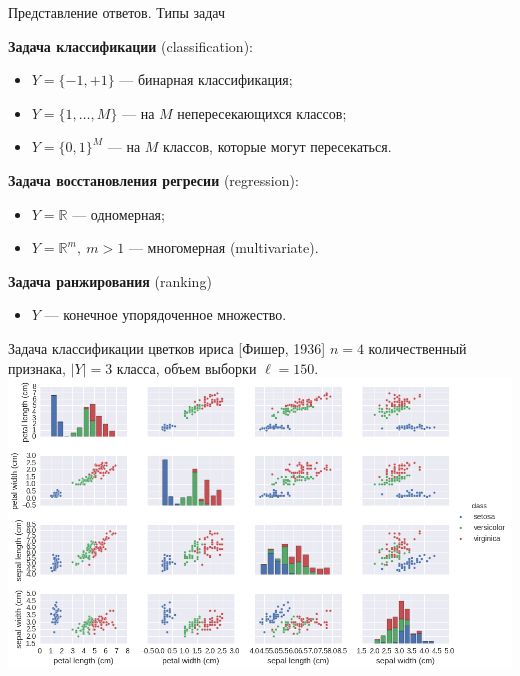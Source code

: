 \documentclass{beamer}
\begin{document}
\begin{frame}{Представление ответов. Типы задач}
    
    {\bf Задача классификации} (classification):
    \begin{itemize}
        \item $Y = \{-1, +1\}$ --- бинарная классификация;
        \item $Y = \{1, \dots, M\}$ --- на $M$ непересекающихся классов;
        \item $Y = \{0, 1\}^M$ --- на $M$ классов, которые могут пересекаться.
    \end{itemize}
    \vfill

    {\bf Задача восстановления регресии} (regression):
    \begin{itemize}
        \item $Y = \mathbb{R}$ --- одномерная;
        \item $Y = \mathbb{R}^m, ~ m > 1$ --- многомерная (multivariate).
    \end{itemize}
    \vfill

    {\bf Задача ранжирования} (ranking)
    \begin{itemize}
        \item $Y$ --- конечное упорядоченное множество.
    \end{itemize}
\end{frame}
\begin{frame}{Задача классификации цветков ириса [Фишер, 1936]}
    \footnotesize $n = 4$ количественный признака, $|Y| = 3$ класса, объем выборки $\ell = 150$.
    \includegraphics[width=\linewidth]{fig/iris.png}
\end{frame}
\end{document}
